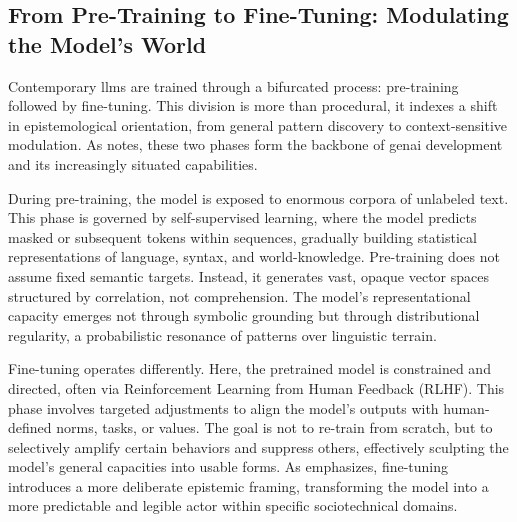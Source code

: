 %
%

\subsection{From Pre-Training to Fine-Tuning: Modulating the Model's
	World}\label{finetuning}

Contemporary \glspl{llm} are trained through a bifurcated process: pre-training followed by fine-tuning. This division is more than procedural, it indexes a shift in epistemological orientation, from general pattern discovery to context-sensitive modulation. As \textcite[964]{dishon2024} notes, these two phases form the backbone of \gls{genai} development and its increasingly situated capabilities.

During pre-training, the model is exposed to enormous corpora of unlabeled text. This phase is governed by self-supervised learning, where the model predicts masked or subsequent \glspl{token} within sequences, gradually building statistical representations of language, syntax, and world-knowledge. Pre-training does not assume fixed semantic targets. Instead, it generates vast, opaque vector spaces structured by correlation, not comprehension. The model's representational capacity emerges not through symbolic grounding but through distributional regularity, a probabilistic resonance of patterns over linguistic terrain.

Fine-tuning operates differently. Here, the pretrained model is constrained and directed, often via Reinforcement Learning from Human Feedback (RLHF). This phase involves targeted adjustments to align the model's outputs with human-defined norms, tasks, or values. The goal is not to re-train from scratch, but to selectively amplify certain behaviors and suppress others, effectively sculpting the model’s general capacities into usable forms. As \textcite[964]{dishon2024} emphasizes, fine-tuning introduces a more deliberate epistemic framing, transforming the model into a more predictable and legible actor within specific sociotechnical domains.


